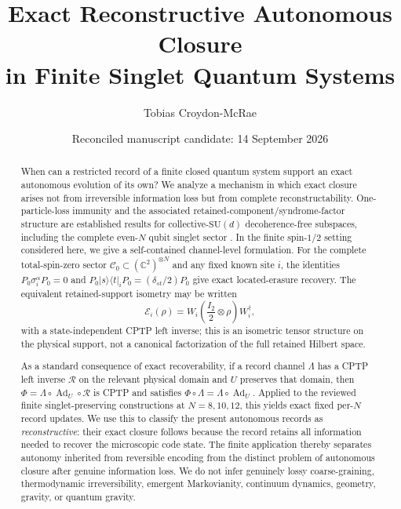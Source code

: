 \documentclass[11pt]{article}
\title{Exact Reconstructive Autonomous Closure\\in Finite Singlet Quantum Systems}
\author{Tobias Croydon-McRae}
\date{Reconciled manuscript candidate: 14 September 2026}
\theoremstyle{definition}
\newcommand{\Code}{\mathcal C}
\newcommand{\E}{\mathcal E}
\newcommand{\R}{\mathcal R}
\newcommand{\Ad}{\operatorname{Ad}}
\newcommand{\SU}{\mathrm{SU}}
\newcommand{\ket}[1]{\lvert #1\rangle}
\newcommand{\bra}[1]{\langle #1\rvert}
\begin{document}
\maketitle

\begin{abstract}
When can a restricted record of a finite closed quantum system support an exact autonomous evolution of its own? We analyze a mechanism in which exact closure arises not from irreversible information loss but from complete reconstructability. One-particle-loss immunity and the associated retained-component/syndrome-factor structure are established results for collective-$\SU(d)$ decoherence-free subspaces, including the complete even-$N$ qubit singlet sector \cite{MigdalBanaszek2011}. In the finite spin-$1/2$ setting considered here, we give a self-contained channel-level formulation. For the complete total-spin-zero sector $\Code_0\subset(\mathbb C^2)^{\otimes N}$ and any fixed known site $i$, the identities $P_0\sigma_i^\alpha P_0=0$ and $P_0\ket{s}\!\bra{t}_iP_0=(\delta_{st}/2)P_0$ give exact located-erasure recovery. The equivalent retained-support isometry may be written
\[
\E_i(\rho)=W_i\!\left(\frac{I_2}{2}\otimes\rho\right)W_i^\dagger,
\]
with a state-independent CPTP left inverse; this is an isometric tensor structure on the physical support, not a canonical factorization of the full retained Hilbert space.

As a standard consequence of exact recoverability, if a record channel $\Lambda$ has a CPTP left inverse $\R$ on the relevant physical domain and $U$ preserves that domain, then $\Phi=\Lambda\circ\Ad_U\circ\R$ is CPTP and satisfies $\Phi\circ\Lambda=\Lambda\circ\Ad_U$. Applied to the reviewed finite singlet-preserving constructions at $N=8,10,12$, this yields exact fixed per-$N$ record updates. We use this to classify the present autonomous records as \emph{reconstructive}: their exact closure follows because the record retains all information needed to recover the microscopic code state. The finite application thereby separates autonomy inherited from reversible encoding from the distinct problem of autonomous closure after genuine information loss. We do not infer genuinely lossy coarse-graining, thermodynamic irreversibility, emergent Markovianity, continuum dynamics, geometry, gravity, or quantum gravity.
\end{abstract}











\appendix


\begingroup
\small


\endgroup
\end{document}
